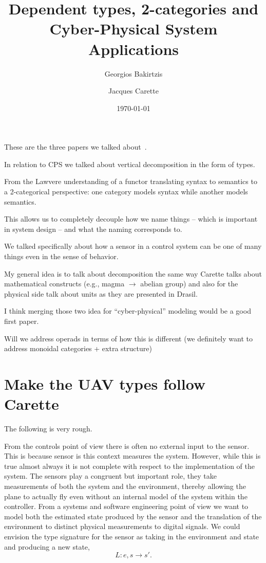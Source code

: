 \documentclass{article}
\title{Dependent types, 2-categories and Cyber-Physical System Applications}
\author{Georgios Bakirtzis \and Jacques Carette}
\date{\today}
\begin{document}
\maketitle

These are the three papers we talked about~\cite{szymczak:2016,carette:2012,smith:1999}.

In relation to CPS we talked about vertical decomposition
in the form of types.

From the Lawvere understanding
of a functor translating syntax to semantics
to a 2-categorical perspective:
one category models syntax while another models semantics.

This allows us to completely decouple how we name things -- which is important
in system design -- and what the naming corresponds to.

We talked specifically about how a sensor
in a control system can be one of many things even
in the sense of behavior.

My general idea is
to talk about decomposition the same way Carette talks about mathematical constructs
(e.g., magma $\rightarrow$ abelian group)
and also for the physical side talk about units as they are presented
in Drasil.

I think merging those two idea for ``cyber-physical'' modeling would be a good first paper.

Will we address operads in terms
of how this is different (we definitely want to address
monoidal categories + extra structure)
\section{Make the UAV types follow Carette}

The following is very rough.

From the controls point
of view there is often no external input to the sensor.
This is because sensor is this context measures the system.
However, while this is true almost always it is not complete
with respect to the implementation of the system.
The sensors play a congruent but important role,
they take measurements of both the system
and the environment, thereby allowing the plane to actually fly
even without an internal model of the system within the controller.
From a systems and software engineering point of view we want to model both
the estimated state produced by the sensor and the translation
of the environment to distinct physical measurements
to digital signals.
We could envision the type signature for the sensor as
taking in the environment and state and producing a new state,
\[{L}: e, s \rightarrow s'.\]
\end{document}
